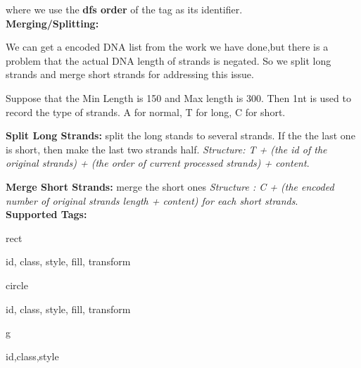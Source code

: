 \documentclass{article}
\begin{document}
where we use the \textbf{dfs order} of the tag as its identifier.\\[10pt]
{\fontsize{12pt}{14.4pt}\textbf{Merging/Splitting:}}
\par
We can get a encoded DNA list from the work we have done,but there is a problem that the actual DNA length of strands is negated. So we split long strands and merge short strands for addressing this issue.
\par Suppose that the Min Length is 150 and Max length is 300. Then 1nt is used to record the type of strands. A for normal, T for long, C for short.
\par 
\textbf{Split Long Strands:} split the long stands to several strands. If the the last one is short, then make the last two strands half.
\emph{Structure: T + (the id of the original strands) + (the order of current processed strands) + content}.
\par 
\textbf{Merge Short Strands:} merge the short ones
\emph{Structure : C + (the encoded number of original strands length + content) for each short strands}.\\[10pt]
{\fontsize{12pt}{14.4pt}\textbf{Supported Tags:}}
\\[10pt]
\begin{Element}{rect}
    \begin{Required}
    \end{Required}
    \begin{Optional}
        id, class, style, fill, transform
    \end{Optional}
\end{Element} 

\begin{Element}{circle}
    \begin{Required}
    \end{Required}
    \begin{Optional}
        id, class, style, fill, transform
    \end{Optional}
\end{Element}

\begin{Element}{g}
    \begin{Optional}
        id,class,style
    \end{Optional}
\end{Element}
\end{document}
